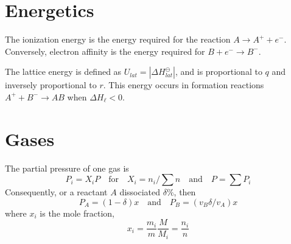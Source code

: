\documentclass{tufte-book}
\begin{document}
\section{Energetics}
The ionization energy is the energy required for the reaction $A \to A^+ + e^-$. Conversely, electron affinity is the energy required for $B + e^- \to B^-$.

\bigskip
The lattice energy is defined as $U_{lat} = |\Delta H^\ominus_{lat}|$, and is proportional to $q$ and inversely proportional to $r$. This energy occurs in formation reactions $A^+ + B^- \to AB$ when $\Delta H_\ell < 0$.

\section{Gases}

The partial pressure of one gas is
\begin{equation}
  P_i = X_i P \quad\text{for}\quad X_i = n_i/\sum n \quad\text{and}\quad P = \sum P_i
\end{equation}
Consequently, or a reactant $A$ dissociated $\delta \%$, then \begin{equation}
  P_A = (1- \delta)x \quad\text{and}\quad P_B = (v_B \delta / v_A)x
\end{equation}
where $x_i$ is the mole fraction, \begin{equation}
  x_i = \frac{m_i}{m} \frac{M}{M_i} = \frac{n_i}{n}
\end{equation}
\end{document}
